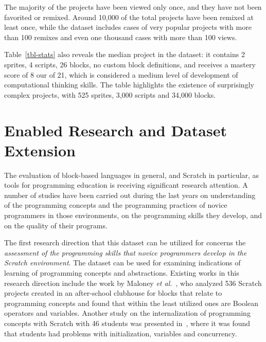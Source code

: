\documentclass[10pt, conference]{IEEEtran}
\newcommand{\fenia}[1]{\emph{\color{blue}Fenia says: #1}}
\begin{document}
The majority of the projects have been viewed only once, and they have not been favorited or remixed.
Around 10,000 of the total projects have been remixed at least once, while the dataset includes cases of very popular projects with more than 100 remixes and even one thousand cases with more than 100 views. 

Table~\ref{tbl-stats} also reveals the median project in the dataset: it contains 2 sprites, 4 scripts, 26 blocks, no custom block definitions, and receives a mastery score of 8 our of 21, which is considered a medium level of development of computational thinking skills. The table highlights the existence of surprisingly complex projects, with 525 sprites, 3,000 scripts and 34,000 blocks.

\section{Enabled Research and Dataset Extension}


The evaluation of block-based languages in general, and Scratch in particular, as tools for programming education is receiving significant research attention.
A number of studies have been carried out during the last years on understanding of the programming concepts and the programming practices of novice programmers in those environments, on the programming skills they develop, and on the quality of their programs.

The first research direction that this dataset can be utilized for concerns the \textit{assessment of the programming skills that novice programmers develop in the Scratch environment}.
The dataset can be used for examining indications of learning of programming concepts and abstractions.
Existing works in this research direction include the work by Maloney \emph{et al.}~\cite{Maloney_2008}, who analyzed 536 Scratch projects created in an after-school clubhouse for blocks that relate to programming concepts and found that within the least utilized ones are Boolean operators and variables.
Another study on the internalization of programming concepts with Scratch with 46 students was presented in~\cite{meerbaum-salant_learning_2010}, where it was found that students had problems with initialization, variables and concurrency.
\end{document}
